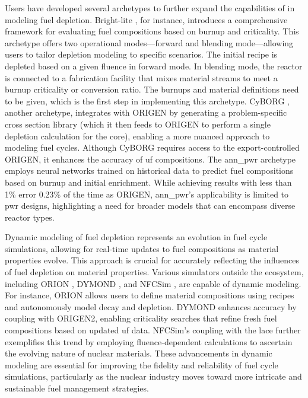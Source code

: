 Users have developed several archetypes to further expand the capabilities of \cyclus in modeling fuel depletion. Bright-lite \cite{schneider_integrated_2016}, for instance, introduces a comprehensive
framework for evaluating fuel compositions based on burnup and criticality.
This archetype offers two operational modes—forward and blending mode—allowing
users to tailor depletion modeling to specific scenarios. The initial recipe is depleted based on a given fluence in forward mode. In blending mode, the
reactor is connected to a fabrication facility that mixes material streams to
meet a burnup criticality or conversion ratio. The burnups and material
definitions need to be given, which is the first step in implementing this
archetype. CyBORG \cite{skutnik_cyborg_2016}, another \cyclus archetype,
integrates \cyclus with ORIGEN by generating a problem-specific cross section
library (which it then feeds to ORIGEN to perform a single depletion
calculation for the core), enabling a more nuanced approach to modeling fuel
cycles. Although CyBORG requires access to the export-controlled ORIGEN, it
enhances the accuracy of \gls{uf} compositions. The ann\_pwr \cite{bae_deep_2020} archetype employs neural networks trained on
historical data to predict fuel compositions based on burnup and initial
enrichment. While achieving results with less than 1\% error 0.23\% of the
time as ORIGEN, ann\_pwr's applicability is limited to \gls{pwr} designs, highlighting a need for broader models that can encompass diverse
reactor types.

Dynamic modeling of fuel depletion represents an evolution in fuel cycle simulations, allowing for real-time updates to fuel compositions as material properties evolve. This approach is crucial for accurately reflecting the
influences of fuel depletion on material properties. Various simulators outside
the \cyclus ecosystem, including ORION \cite{feng_standardized_2016}, DYMOND
\cite{richards_application_2021}, and NFCSim \cite{schneider_nfcsim_2005}, are capable of dynamic modeling. For instance, ORION allows users to
define material compositions using recipes and autonomously model decay and
depletion. DYMOND enhances accuracy by coupling with ORIGEN2, enabling
criticality searches that refine fresh fuel compositions based on updated
\gls{uf} data. NFCSim's coupling with the \gls{lace} further exemplifies this
trend by employing fluence-dependent calculations to ascertain the evolving
nature of nuclear materials. These advancements in dynamic modeling are
essential for improving the fidelity and reliability of fuel cycle simulations,
particularly as the nuclear industry moves toward more intricate and
sustainable fuel management strategies.

